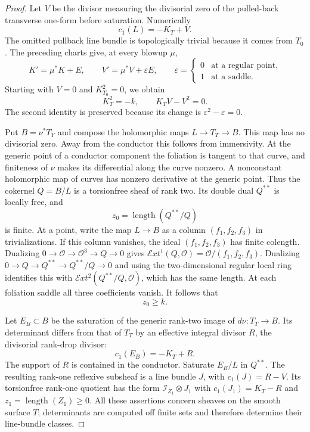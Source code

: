 \begin{proof}
Let $V$ be the divisor measuring the
divisorial zero of the pulled-back transverse
one-form before saturation. Numerically
\[
 c_1(L)=-K_T+V.
\]
The omitted pullback line bundle is topologically
trivial because it comes from $T_0$.
The preceding charts give, at every blowup $\mu$,
\[
 K'=\mu^*K+E,\qquad
 V'=\mu^*V+\varepsilon E,\qquad
 \varepsilon=
 \begin{cases}0&\text{at a regular point},\\
 1&\text{at a saddle}.
 \end{cases}
\]
Starting with $V=0$ and $K_{T_0}^2=0$, we obtain
\[
 K_T^2=-k,\qquad K_TV-V^2=0.
\]
The second identity is preserved because its
change is $\varepsilon^2-\varepsilon=0$.

Put $B=\nu^*T_Y$ and compose the holomorphic
maps $L\to T_T\to B$. This map has no
divisorial zero. Away from the conductor this
follows from immersivity. At the generic point
of a conductor component the foliation is
tangent to that curve, and finiteness of
$\nu$ makes its differential along the curve
nonzero. A nonconstant holomorphic map of
curves has nonzero derivative at the generic
point. Thus the cokernel $Q=B/L$ is a
torsionfree sheaf of rank two. Its double
dual $Q^{**}$ is locally free, and
\[
 z_0=\operatorname{length}(Q^{**}/Q)
\]
is finite. At a point, write the map $L\to B$
as a column $(f_1,f_2,f_3)$ in trivializations.
If this column vanishes, the ideal
$(f_1,f_2,f_3)$ has finite colength. Dualizing
$0\to\mathcal O\to\mathcal O^3\to Q\to0$
gives $\mathcal E xt^1(Q,\mathcal O)
=\mathcal O/(f_1,f_2,f_3)$.
Dualizing $0\to Q\to Q^{**}\to Q^{**}/Q\to0$
and using the two-dimensional regular local
ring identifies this with
$\mathcal E xt^2(Q^{**}/Q,\mathcal O)$,
which has the same length. At each foliation
saddle all three coefficients vanish.
It follows that
\[
 z_0\ge k.
\]

Let $E_B\subset B$ be the saturation of the
generic rank-two image of $d\nu:T_T\to B$.
Its determinant differs from that of $T_T$
by an effective integral divisor $R$, the
divisorial rank-drop divisor:
\[
 c_1(E_B)=-K_T+R.
\]
The support of $R$ is contained in the
conductor. Saturate $E_B/L$ in $Q^{**}$.
The resulting rank-one reflexive subsheaf
is a line bundle $J$, with
$c_1(J)=R-V$. Its torsionfree rank-one
quotient has the form
$\mathcal I_{Z_1}\otimes J_1$ with
$c_1(J_1)=K_T-R$ and
$z_1=\operatorname{length}(Z_1)\ge0$.
All these assertions concern sheaves on the
smooth surface $T$; determinants are computed
off finite sets and therefore determine their
line-bundle classes.


\end{proof}
